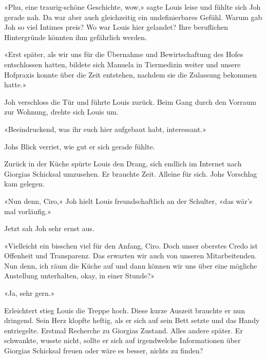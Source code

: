 «Phu, eine traurig-schöne Geschichte, wow,» sagte Louis leise und fühlte sich
Joh gerade nah. Da war aber auch gleichzeitig ein undefinierbares
Gefühl. Warum gab Joh so viel Intimes preis? Wo war Louis hier gelandet?
Ihre beruflichen Hintergründe könnten ihm gefährlich werden. 

«Erst später, als wir uns für die Übernahme und Bewirtschaftung des
Hofes entschlossen hatten, bildete sich Manuela in Tiermedizin weiter
und unsere Hofpraxis konnte über die Zeit entstehen, nachdem sie die
Zulassung bekommen hatte.»

Joh verschloss die Tür und führte Louis zurück. Beim Gang durch den
Vorraum zur Wohnung, drehte sich Louis um.

«Beeindruckend, was ihr euch hier aufgebaut habt, interessant.»

Johs Blick verriet, wie gut er sich gerade fühlte.

Zurück in der Küche spürte Louis den Drang, sich endlich im Internet
nach Giorgias Schicksal umzusehen. Er brauchte Zeit. Alleine für sich.
Johs Vorschlag kam gelegen.

«Nun denn, Ciro,» Joh hielt Louis freundschaftlich an der Schulter, «das
wär’s mal vorläufig.»

Jetzt sah Joh sehr ernst aus.

«Vielleicht ein bisschen viel für den Anfang, Ciro. Doch unser oberstes
Credo ist Offenheit und Transparenz. Das erwarten wir auch von unseren
Mitarbeitenden. Nun denn, ich räum die Küche auf und dann können wir uns
über eine mögliche Anstellung unterhalten, okay, in einer Stunde?»

«Ja, sehr gern.»


\sectionbreak

Erleichtert stieg Louis die Treppe hoch. Diese kurze Auszeit brauchte
er nun dringend.
Sein Herz klopfte heftig, als er sich auf sein Bett setzte und das
Handy entriegelte.
Erstmal Recherche zu Giorgias Zustand. Alles andere später.
Er schwankte, wusste nicht, sollte er sich auf irgendwelche
Informationen über Giorgias Schicksal freuen oder wäre es besser, nichts
zu finden?
